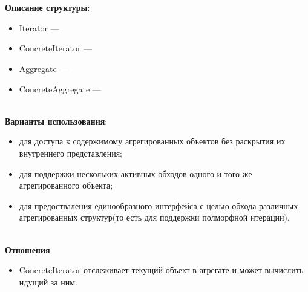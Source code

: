 \documentclass[a3paper,11pt]{report}
\def \boxSize {7cm}
\def \sboxSize {5cm}
\renewcommand{\unidirectionalAssociation}[4]{
	\draw [umlcd style, ->, umlcdNS] (#1) -- (#4)
	node[near end, above]{#2}
	node[near end, below]{#3};
}
\begin{document}
\\\\
\textbf{Описание структуры}:
\begin{itemize}
\item Iterator ---
\item ConcreteIterator ---
\item Aggregate ---
\item ConcreteAggregate ---
\end{itemize}


\large\textbf{\\Варианты использования}:
\begin{itemize}
\item для доступа к содержимому агрегированных объектов без раскрытия их внутреннего представления;
\item для поддержки нескольких активных обходов одного и того же агрегированного объекта;
\item для предостваления единообразного интерфейса с целью обхода различных агрегированных структур(то есть для поддержки полморфной итерации).
\end{itemize}

\textbf{\\Отношения}
\begin{itemize}
\item ConcreteIterator отслеживает текущий объект в агрегате и может вычислить идущий за ним.
\end{itemize}
\end{document}
